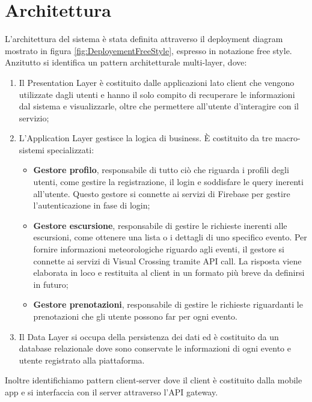 \section{Architettura}

L'architettura del sistema è stata definita attraverso il deployment diagram mostrato in figura \ref{fig:DeployementFreeStyle}, espresso in notazione free style.
Anzitutto si identifica un pattern architetturale multi-layer, dove:
\begin{enumerate}
\item Il Presentation Layer è costituito dalle applicazioni lato client che vengono utilizzate dagli utenti e hanno il solo compito di recuperare le informazioni dal sistema e visualizzarle, oltre che permettere all'utente d'interagire con il servizio;
\item L'Application Layer gestisce la logica di business. È costituito da tre macro-sistemi specializzati:
\begin{itemize}
    \item \textbf{Gestore profilo}, responsabile di tutto ciò che riguarda i profili degli utenti, come gestire la registrazione, il login
    e soddisfare le query inerenti all'utente. Questo gestore si connette ai servizi di Firebase per gestire l'autenticazione in fase di login;
    \item \textbf{Gestore escursione}, responsabile di gestire le richieste inerenti alle escursioni, come ottenere una lista o i dettagli di uno specifico
    evento. Per fornire informazioni meteorologiche riguardo agli eventi, il gestore si connette ai servizi di Visual Crossing tramite API call. La risposta viene elaborata
    in loco e restituita al client in un formato più breve da definirsi in futuro;
    \item \textbf{Gestore prenotazioni}, responsabile di gestire le richieste riguardanti le prenotazioni che gli utente possono far per ogni evento.
\end{itemize}
\item Il Data Layer si occupa della persistenza dei dati ed è costituito da un database relazionale dove sono conservate le informazioni di ogni evento e utente registrato alla piattaforma.
\end{enumerate}
Inoltre identifichiamo pattern client-server dove il client è costituito dalla mobile app e si interfaccia con il server attraverso l'API gateway.

